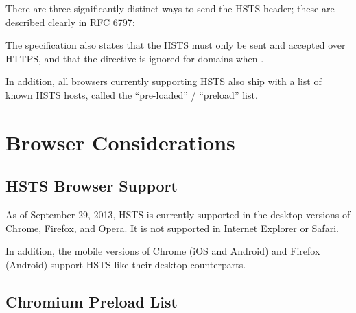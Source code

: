\documentclass{acm_proc_article-sp}
\begin{document}
There are three significantly distinct ways to send the HSTS header; these are described clearly in RFC 6797\cite{rfc}:

{}
{}
{}

The specification also states that the HSTS must only be sent and accepted over HTTPS, and that the {\iSD} directive is ignored for domains when .

In addition, all browsers currently supporting HSTS also ship with a list of known HSTS hosts, called the ``pre-loaded'' / ``preload'' list.

\section{Browser Considerations}
\firstsubsectionskip
\subsection{HSTS Browser Support}

As of September 29, 2013, HSTS is currently supported in the desktop versions of Chrome, Firefox, and Opera. It is not supported in Internet Explorer or Safari.\cite{support}

In addition, the mobile versions of Chrome (iOS and Android) and Firefox (Android) support HSTS like their desktop counterparts\cite{mdn}.

\subsection{Chromium Preload List}
\end{document}
